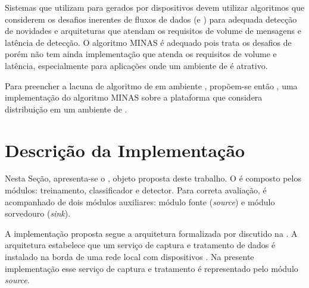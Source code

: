 Sistemas que utilizam \nd para \streams gerados por dispositivos \iot devem
utilizar algoritmos que considerem os desafios inerentes de fluxos de dados
(\evolution e \drift) para adequada detecção de novidades e arquiteturas
que atendam os requisitos de volume de mensagens e latência de detecção.
O algoritmo MINAS é adequado pois trata os desafios de \streamMining porém não
tem ainda implementação que atenda os requisitos de volume e latência,
especialmente para aplicações \iot onde um ambiente de \fog é atrativo.

Para preencher a lacuna de algoritmo de \nd em ambiente \fog, propõem-se então
\mfog, uma implementação do algoritmo MINAS sobre a plataforma \flink que
considera distribuição em um ambiente de \fog.




\section{Descrição da Implementação}\label{sec:descricao}

\newcommand{\source}{\emph{source}\xspace}
\newcommand{\sink}{\emph{sink}\xspace}

\newcommand{\offline}{treinamento\xspace}
\newcommand{\classify}{classificador\xspace}
\newcommand{\detector}{detector\xspace}


Nesta Seção, apresenta-se o \mfog, objeto proposta deste trabalho.
O \mfog é composto pelos módulos: \offline, \classify e \detector.
Para correta avaliação, \mfog é acompanhado de dois módulos auxiliares:
módulo fonte (\source) e módulo sorvedouro (\sink).



A implementação proposta segue a arquitetura \idsiot formalizada por
 discutido na .
A arquitetura \idsiot estabelece que um serviço de captura e tratamento de dados
é instalado na borda de uma rede local com dispositivos \iot.
Na presente implementação
esse serviço de captura e tratamento é representado pelo módulo \source.

